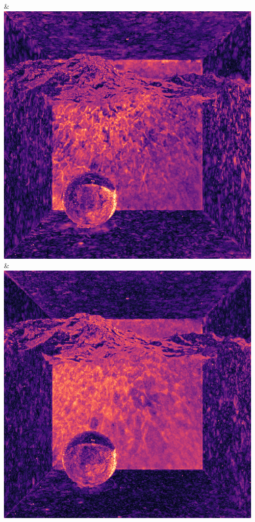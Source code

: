 & \includegraphics[width=\linewidth]{figures/py/tests/quality_comparison/nrc+sppc14@4_1spp_caustics_small_flip.png}
& \includegraphics[width=\linewidth]{figures/py/tests/quality_comparison/nrc+sppc16@1_1spp_caustics_small_flip.png}
